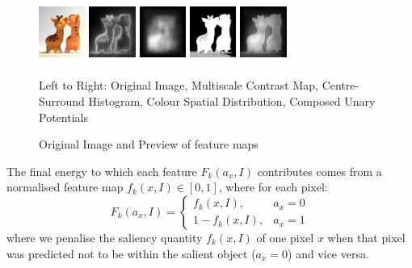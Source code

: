 \documentclass[10pt,twocolumn,letterpaper]{article}
\begin{document}
\begin{figure}[b]
    \begin{center} %
    \includegraphics[width=0.6in,height=0.8in]{./Figures/previews/raw.jpg}
    \includegraphics[width=0.6in,height=0.8in]{./Figures/previews/MC.jpg}
    \includegraphics[width=0.6in,height=0.8in]{./Figures/previews/CSH.jpg} 
    \includegraphics[width=0.6in,height=0.8in]{./Figures/previews/CSD.jpg} 
    \includegraphics[width=0.6in,height=0.8in]{./Figures/previews/Composed.jpg} \\
    \caption{Original Image and Preview of feature maps}\vspace{1mm}
       \small Left to Right: Original Image, Multiscale Contrast Map, Centre-Surround Histogram, Colour Spatial Distribution, Composed Unary Potentials
\end{center}
\end{figure}

The final energy to which each feature $F_k(a_x,I)$ contributes comes from a normalised feature map $f_k(x,I)\in[0,1]$, where for each pixel: $$F_k(a_x,I) = \left\{\begin{matrix}f_k(x,I), & a_x=0\\1-f_k(x,I), & a_x=1\end{matrix}\right.$$ where we penalise the saliency quantity $f_k(x,I)$ of one pixel $x$ when that pixel was predicted not to be within the salient object ($a_x = 0$) and vice versa.
\end{document}
